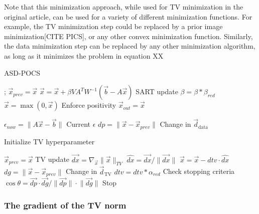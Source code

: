 Note that this minimization approach, while used for TV minimization in the original article, can be used for a variety of different minimization functions. For example, the TV minimization step could be replaced by a prior image minimization[CITE PICS], or any other convex minimization function. Similarly, the data minimization step can be replaced by any other minimization algorithm, as long as it minimizes the problem in equation XX
\begin{algorithm}

\caption{ASD-POCS
\label{alg:ASD-POCS}}
\begin{algorithmic}[1]
;
\State $\vec{x}_{prev}=\vec{x}$
\State  $\vec{x}=\vec{x}+\beta V A^T W^{-1} (\vec{b}-A\vec{x})$
\Comment SART update
\EndFor
\State $\beta=\beta*\beta_{red}$
\State $\vec{x}=\max(0,\vec{x})$
\Comment Enforce positivity
\State $\vec{x}_{out}=\vec{x}$

\State $\epsilon_{now}=\lVert A\vec{x}-\vec{b}\rVert$
\Comment Current $\epsilon$
\State $dp=\lVert\vec{x}-\vec{x}_{prev}\rVert$
\Comment Change in $\vec{d}_{\text{data}}$

\Comment Initialize TV hyperparameter
\EndIf

\State $\vec{x}_{prev}=\vec{x}$
\State
{}
\Comment TV update
\State $\vec{dx}= \nabla_{\vec{x}} \lVert\vec x \rVert_{TV}$
\State $\hat{dx}=\vec{dx}/\lVert\vec{dx}\rVert$
\State $\vec{x}=\vec{x}-dtv\cdot\hat{dx}$
\EndFor
\State $dg=\lVert\vec{x}-\vec{x}_{prev}\rVert$
\Comment Change in $\vec{d}_{\text{TV}}$
\State $dtv=dtv*\alpha_{red}$
\EndIf
\State
\Comment Check stopping criteria
\State $\cos\theta=\vec{dp}\cdot\vec{dg}/\lVert\vec{dp}\rVert\cdot\lVert\vec{dg}\rVert$
\State Stop
\EndIf
\EndWhile

\end{algorithmic}

\end{algorithm}









\FloatBarrier
\subsubsection{The gradient of the TV norm}

